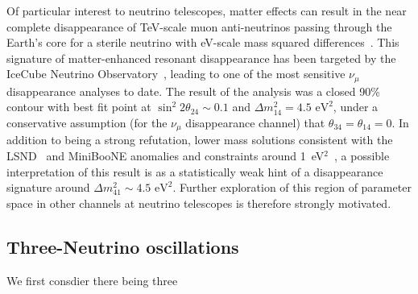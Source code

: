 \documentclass[main.tex]{subfiles}
\begin{document}
Of particular interest to neutrino telescopes, matter effects can result in the near complete disappearance of TeV-scale muon anti-neutrinos passing through the Earth's core for a sterile neutrino with eV-scale mass squared differences~\cite{Nunokawa:2003ep, Choubey:2007ji, Barger:2011rc, Esmaili:2012nz, esmaili2013restricting, Lindner:2015iaa}. This signature of matter-enhanced resonant disappearance has been targeted by the IceCube Neutrino Observatory~\cite{Aartsen_2020, Aartsen_2020_prd}, leading to one of the  most sensitive $\nu_\mu$ disappearance analyses to date. The result of the analysis was a closed 90\% contour with best fit point at $\sin^2 2\theta_{24}\sim0.1$ and $\Delta m^2_{14}=4.5\text{ eV}^2$, under a conservative assumption (for the $\nu_\mu$ disappearance channel) that $\theta_{34}=\theta_{14}=0$. In addition to being a strong refutation, lower mass solutions consistent with the LSND~\cite{Athanassopoulos_1998} and MiniBooNE anomalies and constraints around 1~eV$^2$~\cite{kopp2013sterile, Cirelli:2004cz, abazajian2012light, Gariazzo:2017fdh, Dentler:2017tkw, Diaz:2019fwt}, a possible interpretation of this result is as a statistically weak hint of a disappearance signature around $\Delta m^2_{41}\sim4.5\text{ eV}^2$.  Further exploration of this region of parameter space  in other channels at neutrino telescopes is therefore strongly motivated. 

\subsection{Three-Neutrino oscillations}

We first consdier there being three 
\end{document}
